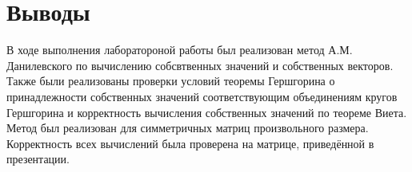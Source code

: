 \documentclass[a4paper, 14pt]{extarticle}
\begin{document}
\section{Выводы}
В ходе выполнения лаборатороной работы был реализован метод А.М. Данилевского по вычислению собсвтвенных значений и собственных векторов. Также были реализованы проверки условий теоремы Гершгорина о принадлежности собственных значений соответствующим объединениям кругов Гершгорина и корректность вычисления собственных значений по теореме Виета. Метод был реализован для симметричных матриц произвольного размера. Корректность всех вычислений была проверена на матрице, приведённой в презентации.
\end{document}
